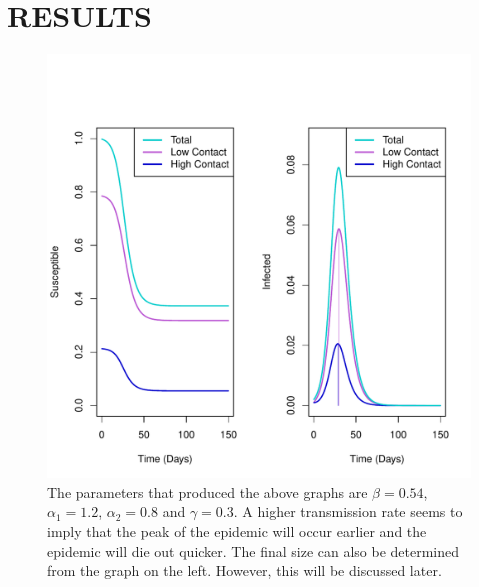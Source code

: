 \documentclass[a4paper, 12pt, journal]{ieeeconf}\usepackage[]{graphicx}\usepackage[]{color}
\begin{document}
\section{RESULTS}


\begin{figure}[thpb]
\centering
\includegraphics[scale = 0.44]{figure/R_B-1.pdf}
\caption{The parameters that produced the above graphs are $\beta = 0.54$, $\alpha_1 = 1.2$, $\alpha_2 = 0.8$ and $\gamma = 0.3$. A higher transmission rate seems to imply that the peak of the epidemic will occur earlier and the epidemic will die out quicker. The final size can also be determined from the graph on the left. However, this will be discussed later.}\label{F:contact}
\end{figure}
\end{document}
